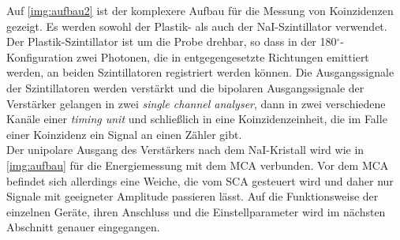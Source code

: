 Auf \autoref{img:aufbau2} ist der komplexere Aufbau für die Messung von Koinzidenzen gezeigt.
Es werden sowohl der Plastik- als auch der NaI-Szintillator verwendet.
Der Plastik-Szintillator ist um die Probe drehbar, so dass in der 180$^\circ$-Konfiguration zwei
Photonen, die in entgegengesetzte Richtungen emittiert werden, an beiden Szintillatoren registriert werden können.
Die Ausgangssignale der Szintillatoren werden verstärkt und die
bipolaren Ausgangssignale der Verstärker gelangen in zwei \emph{single channel analyser},
dann in zwei verschiedene Kanäle einer \emph{timing unit} und schließlich in eine Koinzidenzeinheit,
die im Falle einer Koinzidenz ein Signal an einen Zähler gibt.\\
Der unipolare Ausgang des Verstärkers nach dem NaI-Kristall wird wie in \autoref{img:aufbau}
für die Energiemessung mit dem MCA verbunden. Vor dem MCA befindet sich allerdings eine Weiche,
die vom SCA gesteuert wird und daher nur Signale mit geeigneter Amplitude passieren lässt.
Auf die Funktionsweise der einzelnen Geräte, ihren Anschluss und die Einstellparameter
wird im nächsten Abschnitt genauer eingegangen.



